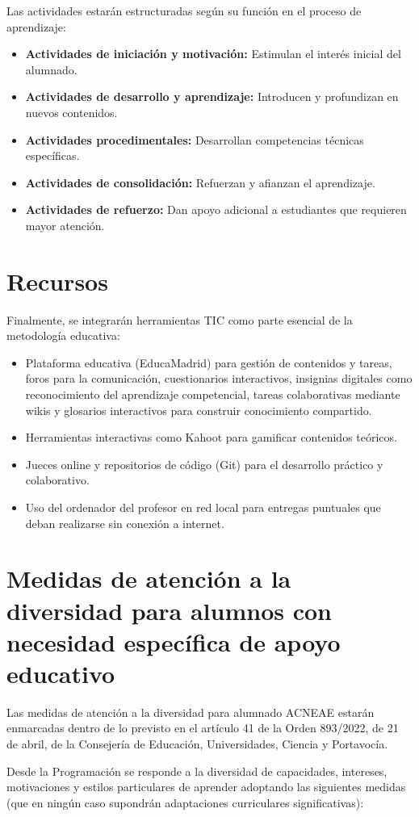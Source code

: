 Las actividades estarán estructuradas según su función en el proceso de aprendizaje:

\begin{itemize}
    \item \textbf{Actividades de iniciación y motivación:} Estimulan el interés inicial del alumnado.
    \item \textbf{Actividades de desarrollo y aprendizaje:} Introducen y profundizan en nuevos contenidos.
    \item \textbf{Actividades procedimentales:} Desarrollan competencias técnicas específicas.
    \item \textbf{Actividades de consolidación:} Refuerzan y afianzan el aprendizaje.
    \item \textbf{Actividades de refuerzo:} Dan apoyo adicional a estudiantes que requieren mayor atención. 
\end{itemize}


\section{Recursos}


Finalmente, se integrarán herramientas TIC como parte esencial de la metodología educativa:

\begin{itemize}
    \item Plataforma educativa (EducaMadrid) para gestión de contenidos y tareas, foros para la comunicación, cuestionarios interactivos, insignias digitales como reconocimiento del aprendizaje competencial, tareas colaborativas mediante wikis y glosarios interactivos para construir conocimiento compartido.
    \item Herramientas interactivas como Kahoot para gamificar contenidos teóricos.
    \item Jueces online y repositorios de código (Git) para el desarrollo práctico y colaborativo.
    \item Uso del ordenador del profesor en red local para entregas puntuales que deban realizarse sin conexión a internet.
\end{itemize}



\section{Medidas de atención a la diversidad para alumnos con necesidad específica de apoyo educativo}


Las medidas de atención a la diversidad para alumnado ACNEAE estarán enmarcadas dentro de lo previsto en el artículo 41 de la Orden 893/2022, de 21 de abril, de la Consejería de Educación, Universidades, Ciencia y Portavocía.

Desde la Programación se responde a la diversidad de capacidades, intereses, motivaciones y estilos particulares de aprender adoptando las siguientes medidas (que en ningún caso supondrán adaptaciones curriculares significativas):

